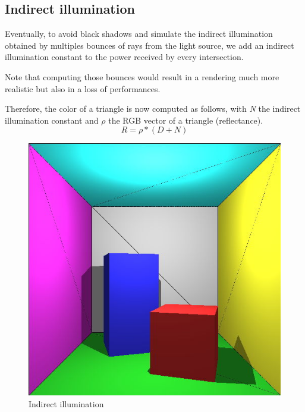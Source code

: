 \subsection{Indirect illumination}
Eventually, to avoid black shadows and simulate the indirect illumination obtained by multiples bounces of rays from the light source, we add an indirect illumination constant to the power received by every intersection.

Note that computing those bounces would result in a rendering much more realistic but also in a loss of performances.

Therefore, the color of a triangle is now computed as follows, with \textit{N} the indirect illumination constant and $\rho$ the RGB vector of a triangle (reflectance).
\begin{equation}
R = \rho * (D+N)
\end{equation}

\begin{figure}[H]
\centering
\includegraphics[width=0.35\linewidth]{img/ind_light.jpg}
\caption{Indirect illumination}
\end{figure}